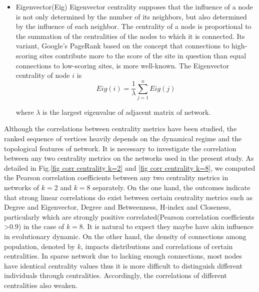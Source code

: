 \documentclass[preprint,12pt,3p]{elsarticle}
\begin{document}
\begin{itemize}
\item Eigenvector(Eig)
Eigenvector centrality supposes that the influence of a node is not only determined by the number of its neighbors, but also determined by the influence of each neighbor.
The centrality of a node is proportional to the summation of the
centralities of the nodes to which it is connected.
Its variant, Google's PageRank based on the concept that connections to high-scoring sites contribute
more to the score of the site in question than equal connections to low-scoring sites, is more well-known.
The Eigenvector centrality of node $i$ is
\begin{equation}\label{Eigenvecotr}
Eig(i)=\frac{1}{\lambda}\sum_{j=1}^{n}{Eig(j)}
\end{equation}

where $\lambda$ is the largest eigenvalue of adjacent matrix of network.

\end{itemize}

\label{centraltiy correlation}
    Although the correlations between centrality metrics have been studied\cite{LiLi-18181,šikićLančić-17843},
the ranked sequence of vertices heavily depends on the dynamical regime and the topological features of network.
It is necessary to investigate the correlation between any two centrality metrics on
the networks used in the present study.
As detailed in Fig.\ref{fig corr centrality k=2} and \ref{fig corr centrality k=8}, we computed the Pearson correlation coefficients between any two centrality metrics in networks of $k=2$ and $k=8$ separately.
    On the one hand, the outcomes indicate that strong linear correlations do exist
between certain centrality metrics such as Degree and Eigenvector, Degree and Betweenness, H-index and Closeness, particularly which are strongly positive correlated(Pearson correlation coefficients >0.9) in the case of $k=8$.
It is natural to expect they maybe have akin influence in evolutionary dynamic.
    On the other hand, the density of connections among population, denoted by $k$, impacts
distributions and correlations of certain centralities.
In sparse network due to lacking enough connections, most nodes have identical centrality values
thus it is more difficult to distinguish different individuals through centralities.
Accordingly, the correlations of different centralities also weaken.
\end{document}
